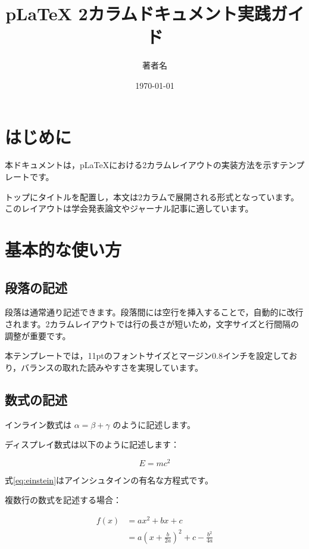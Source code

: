 \documentclass[11pt,a4paper,dvipdfmx,twocolumn]{jarticle}
\title{pLaTeX 2カラムドキュメント実践ガイド}
\author{著者名}
\date{\today}
\begin{document}
\twocolumn[
    \begin{@twocolumnfalse}
        \maketitle
    \end{@twocolumnfalse}
]

\section{はじめに}

本ドキュメントは，pLaTeXにおける2カラムレイアウトの実装方法を示すテンプレートです。

トップにタイトルを配置し，本文は2カラムで展開される形式となっています。このレイアウトは学会発表論文やジャーナル記事に適しています。

\section{基本的な使い方}

\subsection{段落の記述}

段落は通常通り記述できます。段落間には空行を挿入することで，自動的に改行されます。2カラムレイアウトでは行の長さが短いため，文字サイズと行間隔の調整が重要です。

本テンプレートでは，11ptのフォントサイズとマージン0.8インチを設定しており，バランスの取れた読みやすさを実現しています。

\subsection{数式の記述}

インライン数式は \(\alpha = \beta + \gamma\) のように記述します。

ディスプレイ数式は以下のように記述します：

\begin{equation}
    E = mc^2
    \label{eq:einstein}
\end{equation}

式\ref{eq:einstein}はアインシュタインの有名な方程式です。

複数行の数式を記述する場合：

\begin{align}
    f(x) & = ax^2 + bx + c                                         \\
         & = a\left(x + \frac{b}{2a}\right)^2 + c - \frac{b^2}{4a}
    \label{eq:quadratic}
\end{align}
\end{document}
